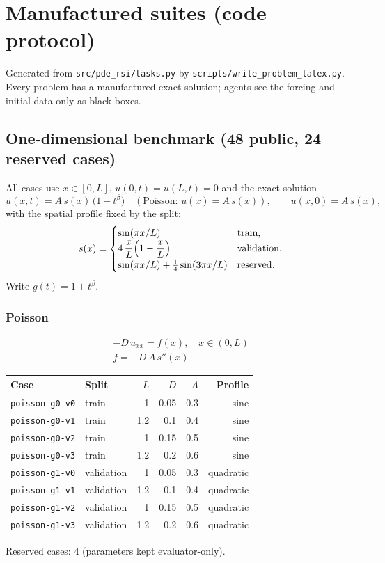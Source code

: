 \documentclass[11pt]{article}
\begin{document}
\section{Manufactured suites (code protocol)}\label{sec:manufactured}
\renewcommand{\thesubsection}{\thesection.\arabic{subsection}}
Generated from \texttt{src/pde\_rsi/tasks.py} by \texttt{scripts/write\_problem\_latex.py}. Every problem has a manufactured exact solution; agents see the forcing and initial data only as black boxes.

\subsection{One-dimensional benchmark (48 public, 24 reserved cases)}
All cases use $x\in[0,L]$, $u(0,t)=u(L,t)=0$ and the exact solution
\begin{equation*}
u(x,t) = A\,s(x)\,\bigl(1+t^{\beta}\bigr) \quad (\text{Poisson: } u(x)=A\,s(x)), \qquad u(x,0)=A\,s(x),
\end{equation*}
with the spatial profile fixed by the split:
\begin{equation*}
s(x)=\begin{cases}
\sin(\pi x/L) & \text{train,}\\
4\,\dfrac{x}{L}\Bigl(1-\dfrac{x}{L}\Bigr) & \text{validation,}\\
\sin(\pi x/L)+\tfrac14\sin(3\pi x/L) & \text{reserved.}
\end{cases}
\end{equation*}
Write $g(t)=1+t^{\beta}$.

\subsubsection{Poisson}
\begin{align*}
-D\,u_{xx} = f(x),\quad x\in(0,L)\\
f = -D\,A\,s''(x)
\end{align*}
\begin{center}\small
\begin{tabular}{llrrrr}
\toprule
Case & Split & $L$ & $D$ & $A$ & Profile \\
\midrule
\texttt{poisson-g0-v0} & train & 1 & 0.05 & 0.3 & sine \\
\texttt{poisson-g0-v1} & train & 1.2 & 0.1 & 0.4 & sine \\
\texttt{poisson-g0-v2} & train & 1 & 0.15 & 0.5 & sine \\
\texttt{poisson-g0-v3} & train & 1.2 & 0.2 & 0.6 & sine \\
\texttt{poisson-g1-v0} & validation & 1 & 0.05 & 0.3 & quadratic \\
\texttt{poisson-g1-v1} & validation & 1.2 & 0.1 & 0.4 & quadratic \\
\texttt{poisson-g1-v2} & validation & 1 & 0.15 & 0.5 & quadratic \\
\texttt{poisson-g1-v3} & validation & 1.2 & 0.2 & 0.6 & quadratic \\
\bottomrule
\end{tabular}
\end{center}
\noindent Reserved cases: 4 (parameters kept evaluator-only).
\end{document}
